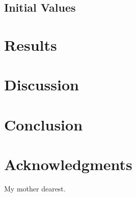 \documentclass[10pt,a4paper]{article}
\begin{document}
\begin{multicols}{1}
\subsection{Initial Values}\label{sec:x0}
\section{Results}\label{sec:results}
\section{Discussion}\label{sec:discussion}
\section{Conclusion}\label{sec:conclusion}

\section*{Acknowledgments}
My mother dearest.

%  
%    
\end{multicols}
\end{document}
